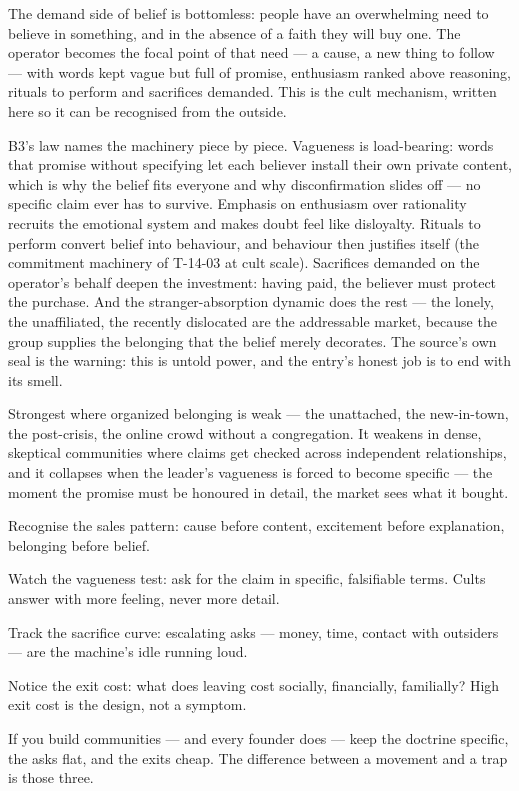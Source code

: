 \begin{core}
The demand side of belief is bottomless: people have an overwhelming need to believe in something, and in the absence of a faith they will buy one. The operator becomes the focal point of that need --- a cause, a new thing to follow --- with words kept vague but full of promise, enthusiasm ranked above reasoning, rituals to perform and sacrifices demanded. This is the cult mechanism, written here so it can be recognised from the outside.
\end{core}
\begin{mechanism}
B3's law names the machinery piece by piece. Vagueness is load-bearing: words that promise without specifying let each believer install their own private content, which is why the belief fits everyone and why disconfirmation slides off --- no specific claim ever has to survive. Emphasis on enthusiasm over rationality recruits the emotional system and makes doubt feel like disloyalty. Rituals to perform convert belief into behaviour, and behaviour then justifies itself (the commitment machinery of T-14-03 at cult scale). Sacrifices demanded on the operator's behalf deepen the investment: having paid, the believer must protect the purchase. And the stranger-absorption dynamic does the rest --- the lonely, the unaffiliated, the recently dislocated are the addressable market, because the group supplies the belonging that the belief merely decorates. The source's own seal is the warning: this is untold power, and the entry's honest job is to end with its smell.
\end{mechanism}
\begin{conditions}
Strongest where organized belonging is weak --- the unattached, the new-in-town, the post-crisis, the online crowd without a congregation. It weakens in dense, skeptical communities where claims get checked across independent relationships, and it collapses when the leader's vagueness is forced to become specific --- the moment the promise must be honoured in detail, the market sees what it bought.
\end{conditions}
\begin{application}
  \item Recognise the sales pattern: cause before content, excitement before explanation, belonging before belief.
  \item Watch the vagueness test: ask for the claim in specific, falsifiable terms. Cults answer with more feeling, never more detail.
  \item Track the sacrifice curve: escalating asks --- money, time, contact with outsiders --- are the machine's idle running loud.
  \item Notice the exit cost: what does leaving cost socially, financially, familially? High exit cost is the design, not a symptom.
  \item If you build communities --- and every founder does --- keep the doctrine specific, the asks flat, and the exits cheap. The difference between a movement and a trap is those three.
\end{application}
